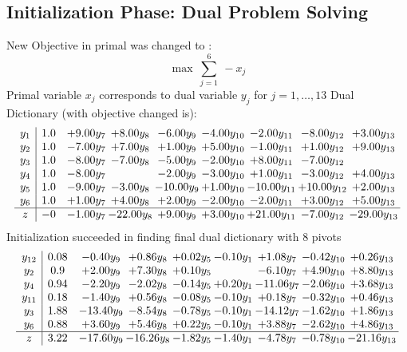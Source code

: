 \documentclass[8pt]{article}
\begin{document}
\subsection{Initialization Phase: Dual Problem Solving}
New Objective in primal was changed to : \[ \max\ \sum_{j=1}^{6}\ - x_j \] 
Primal variable $x_j$ corresponds to dual variable $y_j$ for $j = 1,\ldots,13$
Dual Dictionary (with objective changed is): 
\[\begin{array}{c| c c@{\hskip 2pt} c@{\hskip 2pt} c@{\hskip 2pt} c@{\hskip 2pt} c@{\hskip 2pt} c@{\hskip 2pt} c@{\hskip 2pt} }
 y_{1}   &  1.0 & +  9.00 y_{7} & +  8.00 y_{8} & -6.00 y_{9} & -4.00 y_{10} & -2.00 y_{11} & -8.00 y_{12} & +  3.00 y_{13}\\
 y_{2}   &  1.0 & -7.00 y_{7} & +  7.00 y_{8} & +  1.00 y_{9} & +  5.00 y_{10} & -1.00 y_{11} & +  1.00 y_{12} & +  9.00 y_{13}\\
 y_{3}   &  1.0 & -8.00 y_{7} & -7.00 y_{8} & -5.00 y_{9} & -2.00 y_{10} & +  8.00 y_{11} & -7.00 y_{12} &   \\
 y_{4}   &  1.0 & -8.00 y_{7} &   & -2.00 y_{9} & -3.00 y_{10} & +  1.00 y_{11} & -3.00 y_{12} & +  4.00 y_{13}\\
 y_{5}   &  1.0 & -9.00 y_{7} & -3.00 y_{8} & -10.00 y_{9} & +  1.00 y_{10} & -10.00 y_{11} & + 10.00 y_{12} & +  2.00 y_{13}\\
 y_{6}   &  1.0 & +  1.00 y_{7} & +  4.00 y_{8} & +  2.00 y_{9} & -2.00 y_{10} & -2.00 y_{11} & +  3.00 y_{12} & +  5.00 y_{13}\\
\hline
z    &  -0 & -1.00 y_{7} & -22.00 y_{8} & +  9.00 y_{9} & +  3.00 y_{10} & + 21.00 y_{11} & -7.00 y_{12} & -29.00 y_{13}\\
\end{array}\]
Initialization succeeded in finding final dual dictionary with 8 pivots
\[\begin{array}{c| c c@{\hskip 2pt} c@{\hskip 2pt} c@{\hskip 2pt} c@{\hskip 2pt} c@{\hskip 2pt} c@{\hskip 2pt} c@{\hskip 2pt} }
 y_{12}   &  0.08 & -0.40 y_{9} & +  0.86 y_{8} & +  0.02 y_{5} & -0.10 y_{1} & +  1.08 y_{7} & -0.42 y_{10} & +  0.26 y_{13}\\
 y_{2}   &  0.9 & +  2.00 y_{9} & +  7.30 y_{8} & +  0.10 y_{5} &   & -6.10 y_{7} & +  4.90 y_{10} & +  8.80 y_{13}\\
 y_{4}   &  0.94 & -2.20 y_{9} & -2.02 y_{8} & -0.14 y_{5} & +  0.20 y_{1} & -11.06 y_{7} & -2.06 y_{10} & +  3.68 y_{13}\\
 y_{11}   &  0.18 & -1.40 y_{9} & +  0.56 y_{8} & -0.08 y_{5} & -0.10 y_{1} & +  0.18 y_{7} & -0.32 y_{10} & +  0.46 y_{13}\\
 y_{3}   &  1.88 & -13.40 y_{9} & -8.54 y_{8} & -0.78 y_{5} & -0.10 y_{1} & -14.12 y_{7} & -1.62 y_{10} & +  1.86 y_{13}\\
 y_{6}   &  0.88 & +  3.60 y_{9} & +  5.46 y_{8} & +  0.22 y_{5} & -0.10 y_{1} & +  3.88 y_{7} & -2.62 y_{10} & +  4.86 y_{13}\\
\hline
z    &  3.22 & -17.60 y_{9} & -16.26 y_{8} & -1.82 y_{5} & -1.40 y_{1} & -4.78 y_{7} & -0.78 y_{10} & -21.16 y_{13}\\
\end{array}\]
\end{document}
